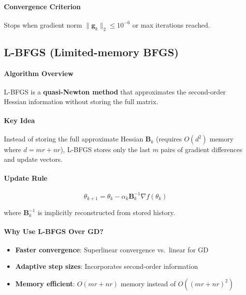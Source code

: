 \documentclass[11pt,oneside]{article}
\newcommand{\defn}[1]{\textbf{#1}}
\newcommand{\grad}{\nabla}
\begin{document}
\paragraph{Convergence Criterion}

Stops when gradient norm $\|\mathbf{g}_k\|_2 \leq 10^{-6}$ or max iterations reached.

\subsection{L-BFGS (Limited-memory BFGS)}\label{subsec:lbfgs}

\paragraph{Algorithm Overview}

L-BFGS is a \defn{quasi-Newton method} that approximates the second-order Hessian information without storing the full matrix.

\paragraph{Key Idea}

Instead of storing the full approximate Hessian $\mathbf{B}_k$ (requires $O(d^2)$ memory where $d = mr + nr$), L-BFGS stores only the last $m$ pairs of gradient differences and update vectors.

\paragraph{Update Rule}

\begin{equation}
    \theta_{k+1} = \theta_k - \alpha_k \mathbf{B}_k^{-1} \grad f(\theta_k)
\end{equation}

where $\mathbf{B}_k^{-1}$ is implicitly reconstructed from stored history.

\paragraph{Why Use L-BFGS Over GD?}

\begin{itemize}
    \item \textbf{Faster convergence}: Superlinear convergence vs.\ linear for GD
    \item \textbf{Adaptive step sizes}: Incorporates second-order information
    \item \textbf{Memory efficient}: $O(mr + nr)$ memory instead of $O((mr + nr)^2)$
\end{itemize}
\end{document}
